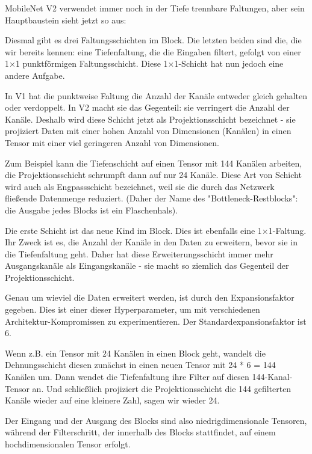 MobileNet V2 verwendet immer noch in der Tiefe trennbare Faltungen, aber sein Hauptbaustein sieht jetzt so aus:


Diesmal gibt es drei Faltungsschichten im Block. Die letzten beiden sind die, die wir bereits kennen: eine Tiefenfaltung, die die Eingaben filtert, gefolgt von einer 1×1 punktförmigen Faltungsschicht. Diese 1×1-Schicht hat nun jedoch eine andere Aufgabe.

In V1 hat die punktweise Faltung die Anzahl der Kanäle entweder gleich gehalten oder verdoppelt. In V2 macht sie das Gegenteil: sie verringert die Anzahl der Kanäle. Deshalb wird diese Schicht jetzt als Projektionsschicht bezeichnet - sie projiziert Daten mit einer hohen Anzahl von Dimensionen (Kanälen) in einen Tensor mit einer viel geringeren Anzahl von Dimensionen.

Zum Beispiel kann die Tiefenschicht auf einen Tensor mit 144 Kanälen arbeiten, die Projektionsschicht schrumpft dann auf nur 24 Kanäle. Diese Art von Schicht wird auch als Engpassschicht bezeichnet, weil sie die durch das Netzwerk fließende Datenmenge reduziert. (Daher der Name des "Bottleneck-Restblocks": die Ausgabe jedes Blocks ist ein Flaschenhals).

Die erste Schicht ist das neue Kind im Block. Dies ist ebenfalls eine 1×1-Faltung. Ihr Zweck ist es, die Anzahl der Kanäle in den Daten zu erweitern, bevor sie in die Tiefenfaltung geht. Daher hat diese Erweiterungsschicht immer mehr Ausgangskanäle als Eingangskanäle - sie macht so ziemlich das Gegenteil der Projektionsschicht.

Genau um wieviel die Daten erweitert werden, ist durch den Expansionsfaktor gegeben. Dies ist einer dieser Hyperparameter, um mit verschiedenen Architektur-Kompromissen zu experimentieren. Der Standardexpansionsfaktor ist 6.

Wenn z.B. ein Tensor mit 24 Kanälen in einen Block geht, wandelt die Dehnungsschicht diesen zunächst in einen neuen Tensor mit 24 * 6 = 144 Kanälen um. Dann wendet die Tiefenfaltung ihre Filter auf diesen 144-Kanal-Tensor an. Und schließlich projiziert die Projektionsschicht die 144 gefilterten Kanäle wieder auf eine kleinere Zahl, sagen wir wieder 24.



Der Eingang und der Ausgang des Blocks sind also niedrigdimensionale Tensoren, während der Filterschritt, der innerhalb des Blocks stattfindet, auf einem hochdimensionalen Tensor erfolgt.

